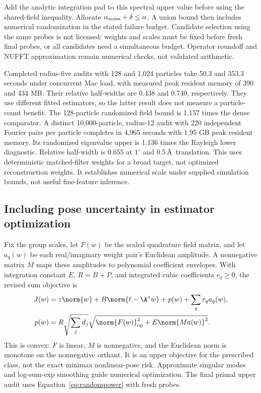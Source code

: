 Add the analytic integration pad to this spectral upper value before using the
shared-field inequality. Allocate $\alpha_{\rm noise}+\delta\le\alpha$. A union
bound then includes numerical randomization in the stated failure budget.
Candidate selection using the same probes is not licensed: weights and scales
must be fixed before fresh final probes, or all candidates need a simultaneous
budget. Operator roundoff and NUFFT approximation remain numerical checks,
not validated arithmetic.

Completed radius-five audits with 128 and 1,024 particles take 50.3 and 353.3
seconds under concurrent Mac load, with measured peak resident memory of 390
and 434 MB. Their relative half-widths are 0.438 and 0.740, respectively. They
use different fitted estimators, so the latter result does not measure a
particle-count benefit. The 128-particle randomized field bound is 1.157 times
the dense comparator. A distinct 10,000-particle, radius-12 audit with 220
independent Fourier pairs per particle completes in 4,965 seconds with 1.95 GB
peak resident memory. Its randomized eigenvalue upper is 1.136 times the
Rayleigh lower diagnostic. Relative half-width is 0.655 at $1^\circ$ and
0.5\,\AA\ translation. This uses deterministic matched-filter weights for a
broad target, not optimized reconstruction weights. It establishes numerical
scale under supplied simulation bounds, not useful fine-feature inference.

\subsection{Including pose uncertainty in estimator optimization}
Fix the group scales, let $F(w)$ be the scaled quadrature field matrix, and let
$a_q(w)$ be each real/imaginary weight pair's Euclidean amplitude. A nonnegative
matrix $M$ maps these amplitudes to polynomial coefficient envelopes. With
integration constant $E$, $R=B+P$, and integrated cubic coefficients $r_q\ge0$,
the revised sum objective is
\begin{align}
 J(w)&=z\norm{w}+B\norm{\ell-\A^*w}+p(w)
       +\sum_q r_q a_q(w),\nonumber\\
 p(w)&=R\sqrt{\sum_jd_j}
 \sqrt{\norm{F(w)}_{\rm op}^2+E\norm{Ma(w)}^2}.
 \label{eq:poseoptimized}
\end{align}
This is convex: $F$ is linear, $M$ is nonnegative, and the Euclidean norm is
monotone on the nonnegative orthant. It is an upper objective for the prescribed
class, not the exact minimax nonlinear-pose risk. Approximate singular modes
and log-sum-exp smoothing guide numerical optimization. The final primal upper
audit uses Equation~\eqref{eq:randompower} with fresh probes.

